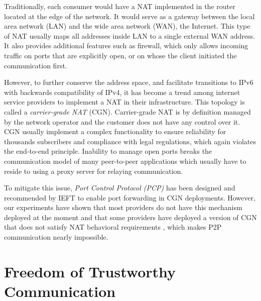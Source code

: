 Traditionally, each consumer would have a NAT implemented in the router located at the edge of the network. It would serve as a gateway between the local area network (LAN) and the wide area network (WAN), the Internet. This type of NAT usually maps all addresses inside LAN to a single external WAN address. It also provides additional features such as firewall, which only allows incoming traffic on ports that are explicitly open, or on whose the client initiated the communication first.


However, to further conserve the address space, and facilitate transitions to IPv6 with backwards compatibility of IPv4, it has become a trend among internet service providers to implement a NAT in their infrastructure. This topology is called a \textit{carrier-grade NAT} (CGN). Carrier-grade NAT is by definition managed by the network operator and the customer does not have any control over it. CGN usually implement a complex functionality to ensure reliability for thousands subscribers and compliance with legal regulations, which again violates the end-to-end principle. Inability to manage open ports breaks the communication model of many peer-to-peer applications which usually have to reside to using a proxy server for relaying communication.

To mitigate this issue, \textit{Port Control Protocol (PCP)} \cite{pcp} has been designed and recommended by IEFT to enable port forwarding in CGN deployments. However, our experiments have shown that most providers do not have this mechanism deployed at the moment and that some providers have deployed a version of CGN that does not satisfy NAT behavioral requirements \cite{behave}, which makes P2P communication nearly impossible.



\section{Freedom of Trustworthy Communication}

